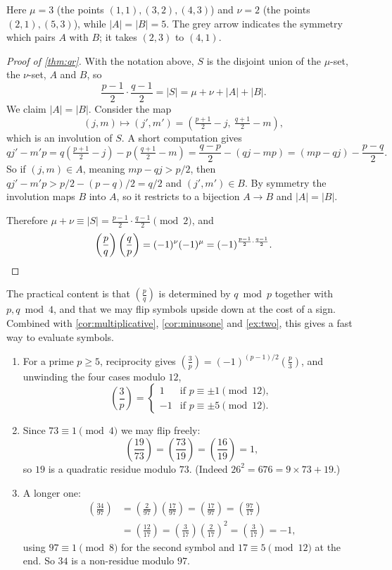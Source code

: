 \documentclass[a4paper]{scrartcl}
\newcommand{\leg}[2]{\left( \frac{#1}{#2} \right)}
\begin{document}
Here $\mu = 3$ (the points $(1,1), (3,2), (4,3)$) and $\nu = 2$ (the points $(2,1), (5,3)$), while $|A| = |B| = 5$. The grey arrow indicates the symmetry which pairs $A$ with $B$; it takes $(2,3)$ to $(4,1)$.

\begin{proof}[Proof of \autoref{thm:qr}]
	With the notation above, $S$ is the disjoint union of the $\mu$-set, the $\nu$-set, $A$ and $B$, so
	$$
	\frac{p-1}2 \cdot \frac{q-1}2 = |S| = \mu + \nu + |A| + |B|.
	$$
	We claim $|A| = |B|$. Consider the map
	$$
	(j, m) \longmapsto (j', m') = \left(\tfrac{p+1}2 - j, \ \tfrac{q+1}2 - m\right),
	$$
	which is an involution of $S$. A short computation gives
	$$
	qj' - m'p = q\left(\tfrac{p+1}2 - j\right) - p\left(\tfrac{q+1}2 - m\right) = \frac{q - p}{2} - (qj - mp) = (mp - qj) - \frac{p - q}{2}.
	$$
	So if $(j,m) \in A$, meaning $mp - qj > p/2$, then $qj' - m'p > p/2 - (p-q)/2 = q/2$ and $(j', m') \in B$. By symmetry the involution maps $B$ into $A$, so it restricts to a bijection $A \to B$ and $|A| = |B|$.

	Therefore $\mu + \nu \equiv |S| = \frac{p-1}2\cdot\frac{q-1}2 \pmod 2$, and
	$$
	\leg pq \leg qp = (-1)^{\nu}(-1)^{\mu} = (-1)^{\frac{p-1}2 \cdot \frac{q-1}2}. \qedhere
	$$
\end{proof}

The practical content is that $\left( \frac pq \right)$ is determined by $q \bmod p$ together with $p, q \bmod 4$, and that we may flip symbols upside down at the cost of a sign. Combined with \autoref{cor:multiplicative}, \autoref{cor:minusone} and \autoref{ex:two}, this gives a fast way to evaluate symbols.

\begin{example}
	\begin{enumerate}[label=(\roman*)]
		\item For a prime $p \geq 5$, reciprocity gives $\left( \frac 3p \right) = (-1)^{(p-1)/2}\left( \frac p3 \right)$, and unwinding the four cases modulo $12$,
		$$
		\leg 3p = \begin{cases} 1 & \text{if } p \equiv \pm 1 \pmod{12}, \\ -1 & \text{if } p \equiv \pm 5 \pmod{12}. \end{cases}
		$$
		\item Since $73 \equiv 1 \pmod 4$ we may flip freely:
		$$
		\leg{19}{73} = \leg{73}{19} = \leg{16}{19} = 1,
		$$
		so $19$ is a quadratic residue modulo $73$. (Indeed $26^2 = 676 = 9 \times 73 + 19$.)
		\item A longer one:
		\begin{align*}
			\leg{34}{97} &= \leg{2}{97}\leg{17}{97} = \leg{17}{97} = \leg{97}{17} \\
			&= \leg{12}{17} = \leg{3}{17}\leg{2}{17}^2 = \leg{3}{17} = -1,
		\end{align*}
		using $97 \equiv 1 \pmod 8$ for the second symbol and $17 \equiv 5 \pmod{12}$ at the end. So $34$ is a non-residue modulo $97$.
	\end{enumerate}
\end{example}
\end{document}
